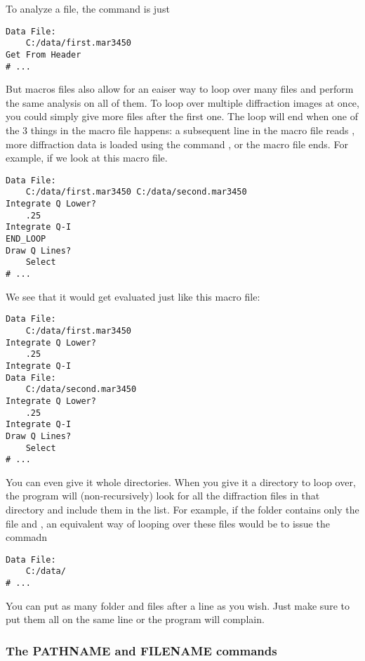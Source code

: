 To analyze a file, the command is just 
\begin{lstlisting}[caption={'Load the Diffraction Data'}]
Data File:
    C:/data/first.mar3450
Get From Header
# ...
\end{lstlisting}
But macros files also allow for an eaiser way
to loop over many files and perform the same
analysis on all of them.  
To loop over multiple diffraction images at once,
you could simply give more files after the first 
one. The loop will end when 
one of the 3 things in the macro 
file happens: a subsequent line in the macro
file reads , more diffraction data
is loaded using the command , or
the macro file ends. For example, if we look at this 
macro file.
\begin{lstlisting}[caption={'Loop Over Diffraction Data'}]
Data File:
    C:/data/first.mar3450 C:/data/second.mar3450 
Integrate Q Lower?
    .25
Integrate Q-I
END_LOOP
Draw Q Lines?
    Select
# ...
\end{lstlisting}
We see that it would get evaluated just like this
macro file:
\begin{lstlisting}[caption={'An Equivalent Macro'}]
Data File:
    C:/data/first.mar3450 
Integrate Q Lower?
    .25
Integrate Q-I
Data File:
    C:/data/second.mar3450 
Integrate Q Lower?
    .25
Integrate Q-I
Draw Q Lines?
    Select
# ...
\end{lstlisting}
You can even give it whole directories. When
you give it a directory to loop over, the program 
will (non-recursively) look for all the diffraction 
files in that directory and include them in the list. 
For example, if the folder  contains
only the file  and
, an equivalent way of looping
over these files would be to issue the commadn
\begin{lstlisting}[caption={'Load the Diffraction Data'}]
Data File:
    C:/data/
# ...
\end{lstlisting}
You can put as many folder and files after a 
 line as you wish.
Just make sure to put them all on the same line 
or the program will complain.

\subsubsection{The PATHNAME and FILENAME commands}

